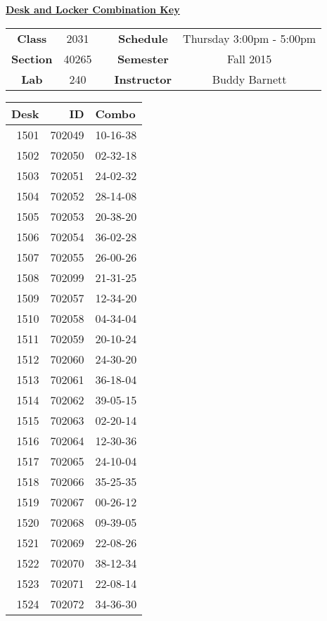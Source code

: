 \documentclass[12pt]{article}
\begin{document}
\thispagestyle{empty}

\begin{center}
	{\huge\textbf{\underline{ Desk and Locker Combination Key}}}
\end{center}


\begin{table}[h]
  \centering
  \begin{tabular}{ccccc}

  \textbf{Class} & 2031 & {\qquad} &\textbf{Schedule} & Thursday 3:00pm - 5:00pm \\
  \textbf{Section} & 40265 & {\qquad} & \textbf{Semester} & Fall 2015 \\
  \textbf{Lab} & 240 & {\qquad} & \textbf{Instructor} & Buddy Barnett \\
  \end{tabular}
\end{table}
 \vspace{0.1in}
\begin{minipage}{0.4\textwidth}

\begin{tabular}{rrl}
\toprule
 Desk &      ID &     Combo \\
\midrule
 1501 &  702049 &  10-16-38 \\
 1502 &  702050 &  02-32-18 \\
 1503 &  702051 &  24-02-32 \\
 1504 &  702052 &  28-14-08 \\
 1505 &  702053 &  20-38-20 \\
 1506 &  702054 &  36-02-28 \\
 1507 &  702055 &  26-00-26 \\
 1508 &  702099 &  21-31-25 \\
 1509 &  702057 &  12-34-20 \\
 1510 &  702058 &  04-34-04 \\
 1511 &  702059 &  20-10-24 \\
 1512 &  702060 &  24-30-20 \\
 1513 &  702061 &  36-18-04 \\
 1514 &  702062 &  39-05-15 \\
 1515 &  702063 &  02-20-14 \\
 1516 &  702064 &  12-30-36 \\
 1517 &  702065 &  24-10-04 \\
 1518 &  702066 &  35-25-35 \\
 1519 &  702067 &  00-26-12 \\
 1520 &  702068 &  09-39-05 \\
 1521 &  702069 &  22-08-26 \\
 1522 &  702070 &  38-12-34 \\
 1523 &  702071 &  22-08-14 \\
 1524 &  702072 &  34-36-30 \\
\bottomrule
\end{tabular}


\end{minipage}
\end{document}
